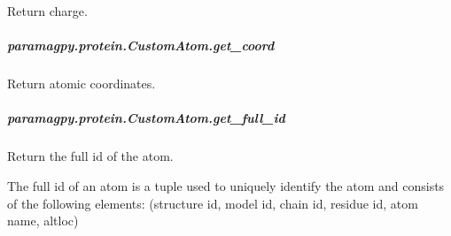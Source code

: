 \documentclass[a4paper,10pt,english,openany,oneside]{sphinxmanual}
\begin{document}
\begin{fulllineitems}
\begin{fulllineitems}
\begin{fulllineitems}
\label{\detokenize{reference/generated/paramagpy.protein.CustomAtom.get_charge:paramagpy.protein.CustomAtom.get_charge}}
\sphinxAtStartPar
Return charge.

\end{fulllineitems}



\subparagraph{paramagpy.protein.CustomAtom.get\_coord}
\label{\detokenize{reference/generated/paramagpy.protein.CustomAtom.get_coord:paramagpy-protein-customatom-get-coord}}\label{\detokenize{reference/generated/paramagpy.protein.CustomAtom.get_coord::doc}}

\begin{fulllineitems}
\label{\detokenize{reference/generated/paramagpy.protein.CustomAtom.get_coord:paramagpy.protein.CustomAtom.get_coord}}
\sphinxAtStartPar
Return atomic coordinates.

\end{fulllineitems}



\subparagraph{paramagpy.protein.CustomAtom.get\_full\_id}
\label{\detokenize{reference/generated/paramagpy.protein.CustomAtom.get_full_id:paramagpy-protein-customatom-get-full-id}}\label{\detokenize{reference/generated/paramagpy.protein.CustomAtom.get_full_id::doc}}

\begin{fulllineitems}
\label{\detokenize{reference/generated/paramagpy.protein.CustomAtom.get_full_id:paramagpy.protein.CustomAtom.get_full_id}}
\sphinxAtStartPar
Return the full id of the atom.

\sphinxAtStartPar
The full id of an atom is a tuple used to uniquely identify
the atom and consists of the following elements:
(structure id, model id, chain id, residue id, atom name, altloc)

\end{fulllineitems}




\end{fulllineitems}
\end{fulllineitems}
\end{document}
